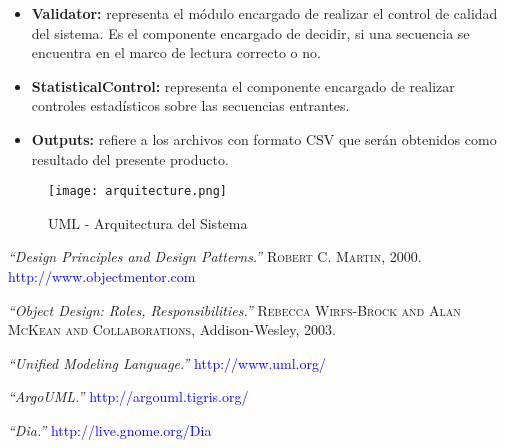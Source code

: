 \documentclass[12pt,a4paper,spanish]{article}
\begin{document}
\begin{itemize}
  \item \textbf{Validator:} representa el módulo encargado de realizar el control de calidad del sistema. Es el componente 	 encargado de decidir, si una secuencia se encuentra en el marco de lectura correcto o no.

  \item \textbf{StatisticalControl:} representa el componente encargado de realizar controles estadísticos sobre las 	 
  secuencias entrantes.

  \item \textbf{Outputs:} refiere a los archivos con formato \textsf{CSV} que serán obtenidos como resultado del presente
  producto.
 
\end{itemize}

\begin{figure}[!hbtp]
	\begin{center}
		\texttt{[image: arquitecture.png]}
		\caption{UML - Arquitectura del Sistema}
		\label{arquitecture}
	\end{center}
\end{figure}







\begin{thebibliography}{99}
\small  {} {\em{“Design Principles and Design Patterns.”}} 
		\textsc{Robert C. Martin}, 2000. \textcolor{blue}{http://www.objectmentor.com}
  
\small  {} {\em{“Object Design: Roles, Responsibilities.”}} 
		\textsc{Rebecca Wirfs-Brock and Alan McKean and Collaborations}, Addison-Wesley, 2003.  

\small  {} {\em{“Unified Modeling Language.”}} \textcolor{blue}{http://www.uml.org/}

\small  {} {\em{“ArgoUML.”}} \textcolor{blue}{http://argouml.tigris.org/}

\small {} {\em{“Dia.”}} \textcolor{blue}{http://live.gnome.org/Dia}
\end{thebibliography}
\end{document}
